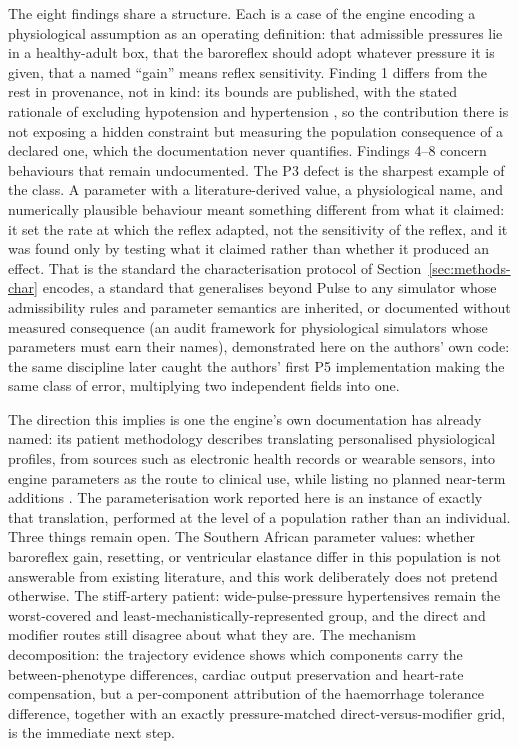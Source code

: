 \documentclass[preprint,12pt,nopreprintline]{elsarticle}
\begin{document}
The eight findings share a structure. Each is a case of the engine encoding a physiological assumption as an operating definition: that admissible pressures lie in a healthy-adult box, that the baroreflex should adopt whatever pressure it is given, that a named ``gain'' means reflex sensitivity. Finding 1 differs from the rest in provenance, not in kind: its bounds are published, with the stated rationale of excluding hypotension and hypertension \cite{pulsepatient}, so the contribution there is not exposing a hidden constraint but measuring the population consequence of a declared one, which the documentation never quantifies. Findings 4--8 concern behaviours that remain undocumented. The P3 defect is the sharpest example of the class. A parameter with a literature-derived value, a physiological name, and numerically plausible behaviour meant something different from what it claimed: it set the rate at which the reflex adapted, not the sensitivity of the reflex, and it was found only by testing what it claimed rather than whether it produced an effect. That is the standard the characterisation protocol of Section~\ref{sec:methods-char} encodes, a standard that generalises beyond Pulse to any simulator whose admissibility rules and parameter semantics are inherited, or documented without measured consequence (an audit framework for physiological simulators whose parameters must earn their names), demonstrated here on the authors' own code: the same discipline later caught the authors' first P5 implementation making the same class of error, multiplying two independent fields into one.

The direction this implies is one the engine's own documentation has already named: its patient methodology describes translating personalised physiological profiles, from sources such as electronic health records or wearable sensors, into engine parameters as the route to clinical use, while listing no planned near-term additions \cite{pulsepatient}. The parameterisation work reported here is an instance of exactly that translation, performed at the level of a population rather than an individual. Three things remain open. The Southern African parameter values: whether baroreflex gain, resetting, or ventricular elastance differ in this population is not answerable from existing literature, and this work deliberately does not pretend otherwise. The stiff-artery patient: wide-pulse-pressure hypertensives remain the worst-covered and least-mechanistically-represented group, and the direct and modifier routes still disagree about what they are. The mechanism decomposition: the trajectory evidence shows which components carry the between-phenotype differences, cardiac output preservation and heart-rate compensation, but a per-component attribution of the haemorrhage tolerance difference, together with an exactly pressure-matched direct-versus-modifier grid, is the immediate next step.
\end{document}
